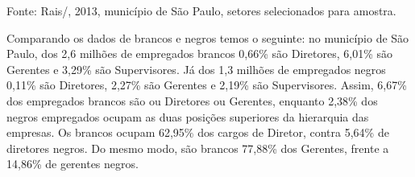 
\smallskip


{\footnotesize{Fonte: Rais/, 2013, município de São Paulo, setores selecionados para amostra.}}

\bigskip

Comparando os dados de brancos e negros temos o seguinte: no município
de São Paulo, dos 2,6 milhões de empregados brancos 0,66\% são
Diretores, 6,01\% são Gerentes e 3,29\% são Supervisores. Já dos 1,3
milhões de empregados negros 0,11\% são Diretores, 2,27\% são Gerentes e
2,19\% são Supervisores. Assim, 6,67\% dos empregados brancos são ou
Diretores ou Gerentes, enquanto 2,38\% dos negros empregados ocupam as
duas posições superiores da hierarquia das empresas. Os brancos ocupam
62,95\% dos cargos de Diretor, contra 5,64\% de diretores negros. Do
mesmo modo, são brancos 77,88\% dos Gerentes, frente a 14,86\% de
gerentes negros.

